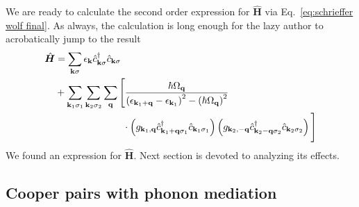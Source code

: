 We are ready to calculate the second order expression for $\hat{\bm H}$ via Eq.~\eqref{eq:schrieffer wolf final}. As always, the calculation is long enough for the lazy author to acrobatically jump to the result
\begin{equation}\label{eq:schrieffer wolf effective hamiltonian}
\begin{aligned}
	\hat{\bm H} &= \sum_{\mathbf{k}\sigma} \epsilon_{\mathbf{k}} \hat{c}_{\mathbf{k}\sigma}^\dagger \hat{c}_{\mathbf{k}\sigma} \\
	&+ \sum_{\mathbf{k}_1 \sigma_1} \sum_{\mathbf{k}_2 \sigma_2} \sum_\mathbf{q} \Bigg[ \frac{
		\hbar\Omega_\mathbf{q}
	}{
		\left({\epsilon_{\mathbf{k}_1+\mathbf{q}} - \epsilon_{\mathbf{k}_1}}\right)^2 - \left({\hbar\Omega_\mathbf{q}}\right)^2
	} \\
	&\hspace{7em} \cdot \left({g_{\mathbf{k}_1,\mathbf{q}} \hat{c}_{\mathbf{k}_1+\mathbf{q}\sigma_1}^\dagger \hat{c}_{\mathbf{k}_1\sigma_1} }\right)
	\left({g_{\mathbf{k}_2,-\mathbf{q}} \hat{c}_{\mathbf{k}_2-\mathbf{q}\sigma_2}^\dagger \hat{c}_{\mathbf{k}_2\sigma_2}}\right) \Bigg]
\end{aligned}
\end{equation}
We found an expression for $\hat{\bm H}$. Next section is devoted to analyzing its effects.

\subsection{Cooper pairs with phonon mediation}

